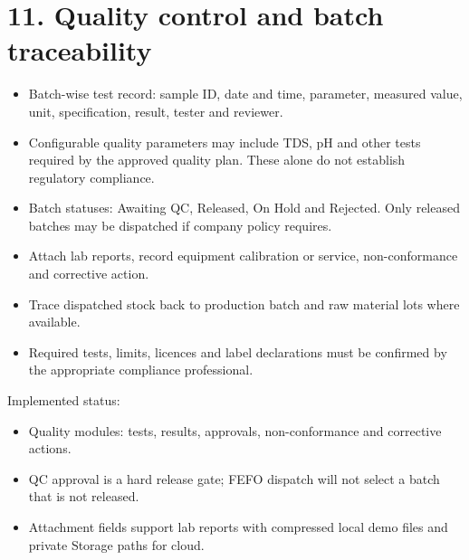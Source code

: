 \documentclass[11pt]{article}
\begin{document}
\section{11. Quality control and batch traceability}
\begin{itemize}[leftmargin=*,itemsep=2pt,topsep=2pt]
\item Batch-wise test record: sample ID, date and time, parameter, measured value, unit, specification, result, tester and reviewer.
\item Configurable quality parameters may include TDS, pH and other tests required by the approved quality plan. These alone do not establish regulatory compliance.
\item Batch statuses: Awaiting QC, Released, On Hold and Rejected. Only released batches may be dispatched if company policy requires.
\item Attach lab reports, record equipment calibration or service, non-conformance and corrective action.
\item Trace dispatched stock back to production batch and raw material lots where available.
\item Required tests, limits, licences and label declarations must be confirmed by the appropriate compliance professional.
\end{itemize}
Implemented status:
\begin{itemize}[leftmargin=*,itemsep=2pt,topsep=2pt]
\item Quality modules: tests, results, approvals, non-conformance and corrective actions.
\item QC approval is a hard release gate; FEFO dispatch will not select a batch that is not released.
\item Attachment fields support lab reports with compressed local demo files and private Storage paths for cloud.
\end{itemize}
\clearpage
\end{document}

